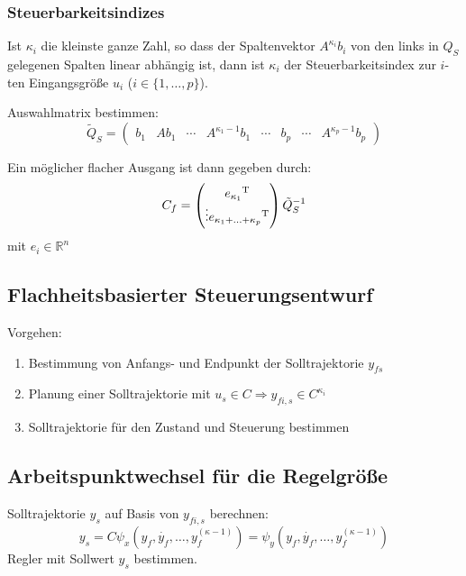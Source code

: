 \subsubsection{Steuerbarkeitsindizes}
Ist $\kappa_i$ die kleinste ganze Zahl, so dass der Spaltenvektor $A^{\kappa_i} b_i$
von den links in $Q_S$ gelegenen Spalten linear abhängig ist, dann ist $\kappa_i$ der
Steuerbarkeitsindex zur $i$-ten Eingangsgröße $u_i$ ($i \in \{1, \ldots, p\}$).

Auswahlmatrix bestimmen:
\begin{equation}
    \tilde{Q}_S = \begin{pmatrix}
            b_1 & A b_1 & \cdots & A^{\kappa_1-1}b_1 & \cdots & b_p & \cdots &
                A^{\kappa_p-1} b_p
        \end{pmatrix}
\end{equation}

Ein möglicher flacher Ausgang ist dann gegeben durch:
\begin{equation}
    C_f = \begin{pmatrix} {e_{\kappa_1}}^\text{T} \\ \vdots {e_{\kappa_1 + \ldots + \kappa_p}}^\text{T} \end{pmatrix}
        {\tilde{Q}_S}^{-1}
\end{equation}
mit $e_i \in \mathbb{R}^n$

\subsection{Flachheitsbasierter Steuerungsentwurf}
Vorgehen:
\begin{enumerate}
    \item Bestimmung von Anfangs- und Endpunkt der Solltrajektorie $y_{fs}$
    \item Planung einer Solltrajektorie mit $u_s \in C \Rightarrow
        y_{fi,s} \in C^{\kappa_i}$
    \item Solltrajektorie für den Zustand und Steuerung bestimmen
\end{enumerate}

\subsection{Arbeitspunktwechsel für die Regelgröße}
Solltrajektorie $y_s$ auf Basis von $y_{fi,s}$ berechnen:
\begin{equation}
    y_s = C \psi_x(y_f, \dot{y_f}, \ldots, y_f^{(\kappa-1)})
        = \psi_y(y_f, \dot{y_f}, \ldots, y_f^{(\kappa-1)})
\end{equation}
Regler mit Sollwert $y_s$ bestimmen.


